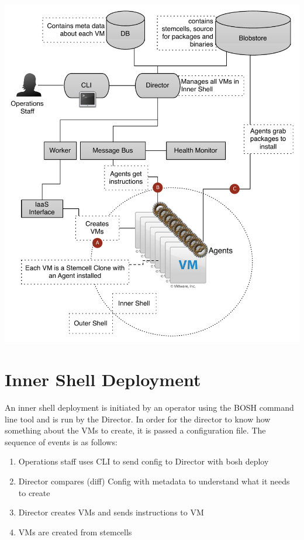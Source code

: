 \includegraphics[keepaspectratio,width=\textwidth,height=0.75\textheight]{fig1.pdf}


\section{Inner Shell Deployment}
\label{innershelldeployment}

An inner shell deployment is initiated by an operator using the BOSH command line tool and is run by the Director. In order for the director to know how something about the VMs to create, it is passed a configuration file. The sequence of events is as follows:

\begin{enumerate}
\item Operations staff uses CLI to send config to Director with bosh deploy

\item Director compares (diff) Config with metadata to understand what it needs to create

\item Director creates VMs and sends instructions to VM

\item VMs are created from stemcells

\end{enumerate}

